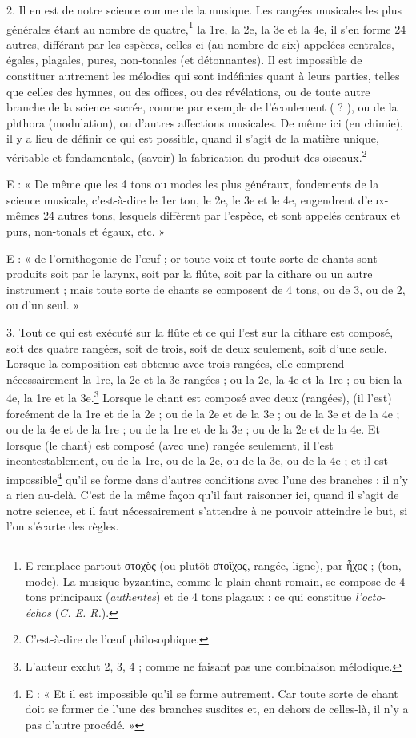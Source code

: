 \documentclass[a4paper, 11pt, oneside, polutonikogreek, french]{article}
\begin{document}
2. Il en est de notre science comme de la musique. Les rangées musicales les plus générales étant au nombre de quatre,\footnote{E remplace partout στοχὸς (ou plutôt στοῖχος, rangée, ligne), par ἦχος ; (ton, mode). La musique byzantine, comme le plain-chant romain, se compose de 4 tons principaux (\emph{authentes}) et de 4 tons plagaux : ce qui constitue \emph{l'octo-échos} (\emph{C. E. R.}).  } la 1re, la 2e, la 3e et la 4e, il s'en forme 24 autres, différant par les espèces, celles-ci (au nombre de six) appelées centrales, égales, plagales, pures, non-tonales (et détonnantes). Il est impossible de constituer autrement les mélodies qui sont indéfinies quant à leurs parties, telles que celles des hymnes, ou des offices, ou des révélations, ou de toute autre branche de la science sacrée, comme par exemple de l'écoulement ( ? ), ou de la phthora (modulation), ou d'autres affections musicales. De même ici (en chimie), il y a lieu de définir ce qui est possible, quand il s'agit de la matière unique, véritable et fondamentale, (savoir) la fabrication du produit des oiseaux.\footnote{C'est-à-dire de l'œuf philosophique.  }

E : « De même que les 4 tons ou modes les plus généraux, fondements de la science musicale, c'est-à-dire le 1er ton, le 2e, le 3e et le 4e, engendrent d'eux-mêmes 24 autres tons, lesquels diffèrent par l'espèce, et sont appelés centraux et purs, non-tonals et égaux, etc. »

E : « de l'ornithogonie de l'œuf ; or toute voix et toute sorte de chants sont produits soit par le larynx, soit par la flûte, soit par la cithare ou un autre instrument ; mais toute sorte de chants se composent de 4 tons, ou de 3, ou de 2, ou d'un seul. »

3. Tout ce qui est exécuté sur la flûte et ce qui l'est sur la cithare est composé, soit des quatre rangées, soit de trois, soit de deux seulement, soit d'une seule. Lorsque la composition est obtenue avec trois rangées, elle comprend nécessairement la 1re, la 2e et la 3e rangées ; ou la 2e, la 4e et la 1re ; ou bien la 4e, la 1re et la 3e.\footnote{L'auteur exclut 2, 3, 4 ; comme ne faisant pas une combinaison mélodique.} Lorsque le chant est composé avec deux (rangées), (il l'est) forcément de la 1re et de la 2e ; ou de la 2e et de la 3e ; ou de la 3e et de la 4e ; ou de la 4e et de la 1re ; ou de la 1re et de la 3e ; ou de la 2e et de la 4e. Et lorsque (le chant) est composé (avec une) rangée seulement, il l'est incontestablement, ou de la 1re, ou de la 2e, ou de la 3e, ou de la 4e ; et il est impossible\footnote{E : « Et il est impossible qu'il se forme autrement. Car toute sorte de chant doit se former de l'une des branches susdites et, en dehors de celles-là, il n'y a pas d'autre procédé. »} qu'il se forme dans d'autres conditions avec l'une des branches : il n'y a rien au-delà. C'est de la même façon qu'il faut raisonner ici, quand il s'agit de notre science, et il faut nécessairement s'attendre à ne pouvoir atteindre le but, si l'on s'écarte des règles.
\end{document}
